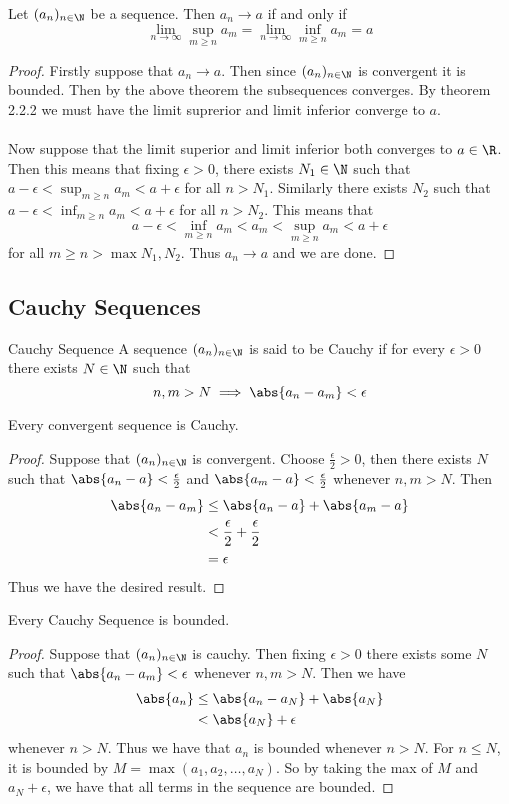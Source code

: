 \begin{prp}{}{} Let $(a_n)_{n\in\N}$ be a sequence. Then $a_n\to a$ if and only if $$\lim_{n\to\infty}\sup_{m\geq n}a_m=\lim_{n\to\infty}\inf_{m\geq n}a_m=a$$ \tcbline
\begin{proof}
Firstly suppose that $a_n\to a$. Then since $(a_n)_{n\in\N}$ is convergent it is bounded. Then by the above theorem the subsequences converges. By theorem 2.2.2 we must have the limit suprerior and limit inferior converge to $a$. \\~\\
Now suppose that the limit superior and limit inferior both converges to $a\in\R$. Then this means that fixing $\epsilon>0$, there exists $N_1\in\N$ such that $a-\epsilon<\sup_{m\geq n}a_m<a+\epsilon$ for all $n>N_1$. Similarly there exists $N_2$ such that $a-\epsilon<\inf_{m\geq n}a_m<a+\epsilon$ for all $n>N_2$. This means that $$a-\epsilon<\inf_{m\geq n}a_m<a_m<\sup_{m\geq n}a_m<a+\epsilon$$ for all $m\geq n>\max{N_1,N_2}$. Thus $a_n\to a$ and we are done. 
\end{proof}
\end{prp}

\subsection{Cauchy Sequences}
\begin{defn}{Cauchy Sequence}{} A sequence $(a_n)_{n\in\N}$ is said to be Cauchy if for every $\epsilon>0$ there exists $N\in\N$ such that $$n,m>N\implies\abs{a_n-a_m}<\epsilon$$
\end{defn}

\begin{prp}{}{} Every convergent sequence is Cauchy. \tcbline
\begin{proof} Suppose that $(a_n)_{n\in\N}$ is convergent. Choose $\frac{\epsilon}{2}>0$, then there exists $N$ such that $\abs{a_n-a}<\frac{\epsilon}{2}$ and $\abs{a_m-a}<\frac{\epsilon}{2}$ whenever $n,m>N$. Then 
\begin{align*}
\abs{a_n-a_m}&\leq\abs{a_n-a}+\abs{a_m-a} \\
&<\frac{\epsilon}{2}+\frac{\epsilon}{2} \\
&=\epsilon
\end{align*}
Thus we have the desired result. 
\end{proof}
\end{prp}

\begin{prp}{}{} Every Cauchy Sequence is bounded. \tcbline
\begin{proof} Suppose that $(a_n)_{n\in\N}$ is cauchy. Then fixing $\epsilon>0$ there exists some $N$ such that $\abs{a_n-a_m}<\epsilon$ whenever $n,m>N$. Then we have
\begin{align*}
\abs{a_n}&\leq\abs{a_n-a_N}+\abs{a_N}\\
&<\abs{a_N}+\epsilon
\end{align*}
whenever $n>N$. Thus we have that $a_n$ is bounded whenever $n>N$. For $n\leq N$, it is bounded by $M=\max{(a_1,a_2,\dots,a_N)}$. So by taking the max of $M$ and $a_N+\epsilon$, we have that all terms in the sequence are bounded. 
\end{proof}
\end{prp}

